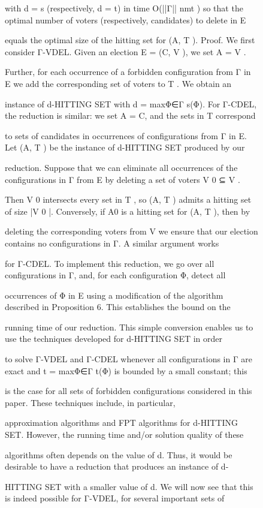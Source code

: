\documentclass[12pt, a4paper]{report}
\begin{document}
\begin{figure}[ht!]
with d = s (respectively, d = t) in time O(||Γ|| nmt ) so that the optimal number of voters (respectively, candidates) to delete in E 

equals the optimal size of the hitting set for (A, T ). Proof. We first consider Γ-VDEL. Given an election E = (C, V ), we set A = V . 

Further, for each occurrence of a forbidden configuration from Γ in E we add the corresponding set of voters to T . We obtain an 

instance of d-HITTING SET with d = maxΦ∈Γ s(Φ). For Γ-CDEL, the reduction is similar: we set A = C, and the sets in T correspond 

to sets of candidates in occurrences of configurations from Γ in E. Let (A, T ) be the instance of d-HITTING SET produced by our 

reduction. Suppose that we can eliminate all occurrences of the configurations in Γ from E by deleting a set of voters V 0 ⊆ V . 

Then V 0 intersects every set in T , so (A, T ) admits a hitting set of size |V 0 |. Conversely, if A0 is a hitting set for (A, T ), then by 

deleting the corresponding voters from V we ensure that our election contains no configurations in Γ. A similar argument works 

for Γ-CDEL. To implement this reduction, we go over all configurations in Γ, and, for each configuration Φ, detect all 

occurrences of Φ in E using a modification of the algorithm described in Proposition 6. This establishes the bound on the 

running time of our reduction. This simple conversion enables us to use the techniques developed for d-HITTING SET in order 

to solve Γ-VDEL and Γ-CDEL whenever all configurations in Γ are exact and t = maxΦ∈Γ t(Φ) is bounded by a small constant; this 

is the case for all sets of forbidden configurations considered in this paper. These techniques include, in particular, 

approximation algorithms and FPT algorithms for d-HITTING SET. However, the running time and/or solution quality of these 

algorithms often depends on the value of d. Thus, it would be desirable to have a reduction that produces an instance of d-

HITTING SET with a smaller value of d. We will now see that this is indeed possible for Γ-VDEL, for several important sets of 


\end{figure}
\end{document}
